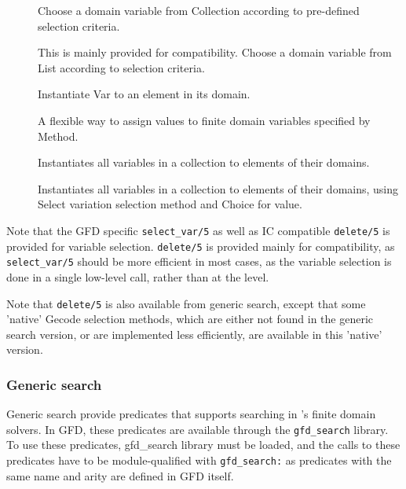 \begin{description}
\item[]
Choose a domain variable from Collection according to pre-defined selection criteria.

\item[]
This is mainly provided for compatibility. Choose a domain variable from List according to selection criteria.

\item[]
Instantiate Var to an element in its domain.

\item[]
A flexible way to assign values to finite domain variables specified
 by Method.

\item[]
Instantiates all variables in a collection to elements of their domains.

\item[]
Instantiates all variables in a collection to elements of their domains, using 
Select variation selection method and Choice for value.
\end{description}

Note that the GFD specific {\tt select_var/5} as well as IC compatible 
{\tt delete/5} is provided for variable selection. {\tt delete/5} is provided 
mainly for compatibility, as {\tt select_var/5} should be more efficient in
most cases, as the variable selection is done in a single low-level call,
rather than at the \eclipse level.

Note that {\tt delete/5} 
is also available from generic search, except that
some 'native' Gecode selection methods, which are either not found in the generic search version,  or are implemented less efficiently, are available in this 
'native' version. 

\subsubsection{Generic search}
Generic search provide predicates that supports searching in \eclipse's 
finite domain solvers. In GFD, these predicates are available through the
{\tt gfd_search} library. To use these predicates, gfd_search library must
be loaded, and the calls to these predicates have to be module-qualified
with {\tt gfd_search:} as predicates with the same name and arity are defined
in GFD itself.

